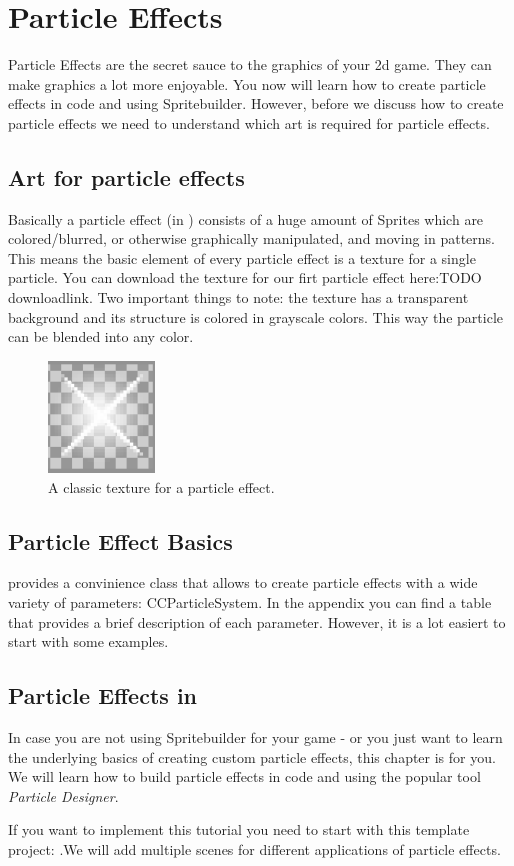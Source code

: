 \chapter{Particle Effects}
Particle Effects are the secret sauce to the graphics of your 2d game. They can
make graphics a lot more enjoyable. You now will learn how to create particle
effects in code and using Spritebuilder. However, before we discuss how to
create particle effects we need to understand which art is required for particle
effects.

\section{Art for particle effects}
Basically a particle effect (in \cocos{}) consists of a huge amount of Sprites
which are colored/blurred, or otherwise graphically manipulated, and moving in
patterns. This means the basic element of every particle effect is a texture for
a single particle. You can download the texture for our firt particle effect
here:TODO downloadlink. Two important things to note: the texture has a
transparent background and its structure is colored in grayscale colors. This
way the particle can be blended into any color. 
 \begin{figure}[H]
		\centering
		\includegraphics[width=80pt]{images/particle_stars.png}     
		\caption{A classic texture for a particle effect.}
\end{figure}

\section{Particle Effect Basics}
\cocos{} provides a convinience class that allows to create particle effects
with a wide variety of parameters: CCParticleSystem.
In the appendix you can find a table that provides a brief description of each
parameter. However, it is a lot easiert to start with some examples.
\section{Particle Effects in \cocos{}}
In case you are not using Spritebuilder for your game - or you just want to
learn the underlying basics of creating custom particle effects, this chapter is
for you. We will learn how to build particle effects in code and using the
popular tool \textit{Particle Designer}.
\begin{lamp}[frametitle={Following this tutorial}]
If you want to implement this tutorial you need to start with this template
project: .We will add multiple scenes for different applications of particle
effects.
\end{lamp}
\label{subsec:particle effects in code}
